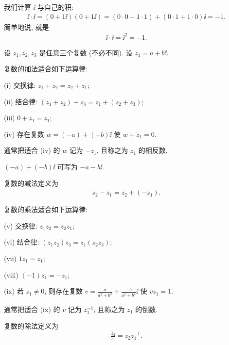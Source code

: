 \begin{example}
    我们计算 $\ii$ 与自己的积:
    \begin{align*}
        \ii \cdot \ii = (0 + 1\ii) (0 + 1\ii) = (0 \cdot 0 - 1 \cdot 1) + (0 \cdot 1 + 1 \cdot 0) \ii = -1.
    \end{align*}
    简单地说, 就是
    \begin{align*}
        \ii \cdot \ii = \ii^2 = -1.
    \end{align*}
\end{example}

设 $z_1, z_2, z_3$ 是任意三个复数 (不必不同). 设 $z_1 = a + b \ii$.

\begin{proposition}
    复数的加法适合如下运算律:

    (i) 交换律: $z_1 + z_2 = z_2 + z_1$;

    (ii) 结合律: $(z_1 + z_2) + z_3 = z_1 + (z_2 + z_3)$;

    (iii) $0 + z_1 = z_1$;

    (iv) 存在复数 $w = (-a) + (-b) \ii$ 使 $w + z_1 = 0$.

    通常把适合 (iv) 的 $w$ 记为 $-z_1$, 且称之为 $z_1$ 的相反数.
\end{proposition}

\begin{remark}
    $(-a) + (-b) \ii$ 可写为 $-a-b \ii$.
\end{remark}

\begin{definition}
    复数的减法定义为
    \begin{align*}
        z_2 - z_1 = z_2 + (-z_1).
    \end{align*}
\end{definition}

\begin{proposition}
    复数的乘法适合如下运算律:

    (v) 交换律: $z_1 z_2 = z_2 z_1$;

    (vi) 结合律: $(z_1 z_2) z_3 = z_1 (z_2 z_3)$;

    (vii) $1 z_1 = z_1$;

    (viii) $(-1) z_1 = -z_1$;

    (ix) 若 $z_1 \neq 0$, 则存在复数 $v = \frac{a}{a^2 + b^2} + \frac{-b}{a^2 + b^2} \ii$ 使 $v z_1 = 1$.

    通常把适合 (ix) 的 $v$ 记为 $z_1^{-1}$, 且称之为 $z_1$ 的倒数.
\end{proposition}

\begin{definition}
    复数的除法定义为
    \begin{align*}
        \frac{z_2}{z_1} = z_2 z_1^{-1}.
    \end{align*}
\end{definition}

